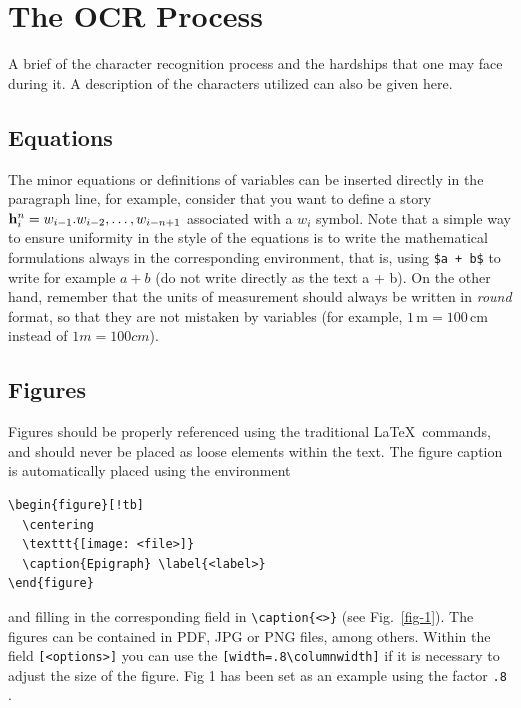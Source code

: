 \section{The OCR Process}

A brief of the character recognition process and the hardships that one may face during it. A description of the characters utilized can also be given here.

\subsection{Equations}

The minor equations or definitions of variables can be inserted directly in the paragraph line, for example, consider that you want to define a story $\mathbf{h}_i^n = w_{i-1}. w_{i-2}, \dots, w_{i-n+1}$ associated with a $w_i$ symbol. Note that a simple way to ensure uniformity in the style of the equations is to write the mathematical formulations always in the corresponding environment, that is, using \verb!$a + b$! to write for example $a + b$ (do not write directly as the text a + b). On the other hand, remember that the units of measurement should always be written in \emph{round} format, so that they are not mistaken by variables (for example, $1\,\text{m} = 100\,\text{cm}$ instead of $1m = 100cm$).

\subsection{Figures}

Figures should be properly referenced using the traditional \LaTeX\ commands, and should never be placed as loose elements within the text. The figure caption is automatically placed using the environment
\begin{verbatim}
\begin{figure}[!tb]
  \centering
  \texttt{[image: <file>]}
  \caption{Epigraph} \label{<label>}
\end{figure}
\end{verbatim}
and filling in the corresponding field in \verb!\caption{<>}! (see Fig.~\ref{fig-1}). The figures can be contained in PDF, JPG or PNG files, among others. Within the field \verb![<options>]! you can use the \verb![width=.8\columnwidth]! if it is necessary to adjust the size of the figure. Fig 1 has been set as an example using the factor \verb!.8! .

